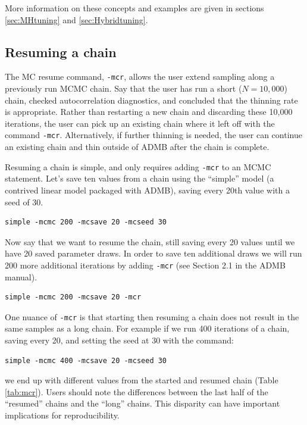 \documentclass{article}\usepackage[]{graphicx}\usepackage[]{color}
\begin{document}
More information on these concepts and examples are given in sections
\ref{sec:MHtuning} and \ref{sec:Hybridtuning}.

\subsection{Resuming a chain}\label{sec:mcr}
The MC resume command, \texttt{-mcr}, allows the user extend sampling
along a previously run MCMC chain. Say that the user has run a short
($N=10,000$) chain, checked autocorrelation diagnostics, and concluded that
the thinning rate is appropriate. Rather than restarting a new chain and
discarding these 10,000 iterations, the user can pick up an existing chain
where it left off with the command \texttt{-mcr}. Alternatively, if further
thinning is needed, the user can continue an existing chain and thin
outside of ADMB after the chain is complete.

Resuming a chain is simple, and only requires adding \texttt{-mcr} to an MCMC
statement. Let's save ten values from a chain using the ``simple'' model (a
contrived linear model packaged with ADMB), saving every 20th value with
a seed of 30.

\begin{verbatim}
simple -mcmc 200 -mcsave 20 -mcseed 30
\end{verbatim}

Now say that we want to resume the chain, still saving every 20 values
until we have 20 saved parameter draws. In order to save ten additional
draws we will run 200 more additional iterations by adding \texttt{-mcr}
(see Section 2.1 in the ADMB manual).

\begin{verbatim}
simple -mcmc 200 -mcsave 20 -mcr
\end{verbatim}

One nuance of \texttt{-mcr} is that starting then resuming a chain does not
result in the same samples as a long chain. For example if we run 400
iterations of a chain, saving every 20, and setting the seed at 30 with the
command:

\begin{verbatim}
simple -mcmc 400 -mcsave 20 -mcseed 30
\end{verbatim}

we end up with different values from the started and resumed chain (Table \ref{tab:mcr}).
Users should note the differences between the last half of the ``resumed'' chains
and the ``long'' chains. This disparity can have important implications for
reproducibility.
\end{document}
